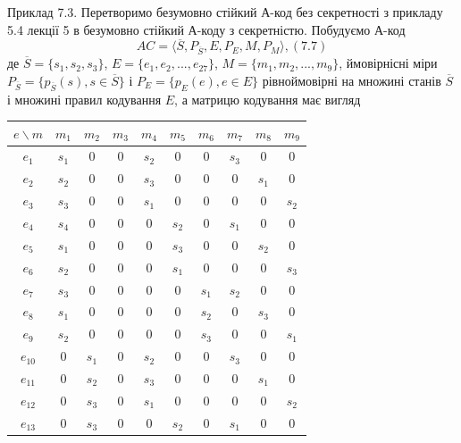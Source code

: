 \begin{example}
    Приклад 7.3. Перетворимо безумовно стійкий А-код без секретності з
    прикладу 5.4 лекції 5 в безумовно стійкий А-коду з секретністю.
    Побудуємо А-код
    \begin{equation}
        AC = \langle \overline{S}, P_{\overline{S}}, E, P_E, M, P_M \rangle, (7.7)
    \end{equation}
    де $\overline{S} = \{s_1, s_2, s_3\}$, $E = \{e_1, e_2, ..., e_{27}\}$, $M = \{m_1, m_2, ..., m_{9}\}$, ймовірнісні міри
    $P_{\overline{S}} = \{p_{\overline{S}}(s), s \in \overline{S}\}$ і $P_{E} = \{p_{E}(e), e \in E\}$ рівноймовірні на множині станів $\overline{S}$ і
    множині правил кодування $E$, а матрицю кодування має вигляд
    \begin{center}
        \begin{tabular}{|c|c|c|c|c|c|c|c|c|c|}
            \hline
            $e \backslash m$ & $m_1$ & $m_2$ & $m_3$ & $m_4$ & $m_5$ & $m_6$ & $m_7$ & $m_8$ & $m_9$ \\\hline
            $e_{1}$  & $s_1$ & 0 & 0 & $s_2$ & 0 & 0 & $s_3$ & 0 & 0 \\\hline
            $e_{2}$  & $s_2$ & 0 & 0 & $s_3$ & 0 & 0 & 0 & $s_1$ &0 \\\hline
            $e_{3}$  & $s_3$ & 0 & 0 & $s_1$ & 0 & 0 & 0 & 0 & $s_2$ \\\hline
            $e_{4}$  & $s_4$ & 0 & 0 & 0 & $s_2$ & 0 & $s_1$ & 0 & 0 \\\hline
            $e_{5}$  & $s_1$ & 0 & 0 & 0 & $s_3$ & 0 & 0 & $s_2$ & 0 \\\hline
            $e_{6}$  & $s_2$ & 0 & 0 & 0 & $s_1$ & 0 & 0 & 0 & $s_3$ \\\hline
            $e_{7}$  & $s_3$ & 0 & 0 & 0 & 0 & $s_1$ & $s_2$ & 0 & 0 \\\hline
            $e_{8}$  & $s_1$ & 0 & 0 & 0 & 0 & $s_2$ & 0 & $s_3$ & 0 \\\hline
            $e_{9}$  & $s_2$ & 0 & 0 & 0 & 0 & $s_3$ & 0 & 0 & $s_1$ \\\hline
            $e_{10}$ & 0 & $s_1$ & 0 & $s_2$ & 0 & 0 & $s_3$ & 0 & 0 \\\hline
            $e_{11}$ & 0 & $s_2$ & 0 & $s_3$ & 0 & 0 & 0 & $s_1$ & 0 \\\hline
            $e_{12}$ & 0 & $s_3$ & 0 & $s_1$ & 0 & 0 & 0 & 0 & $s_2$ \\\hline
            $e_{13}$ & 0 & $s_3$ & 0 & 0 & $s_2$ & 0 & $s_1$ & 0 & 0 \\\hline

\end{tabular}
\end{center}
\end{example}
